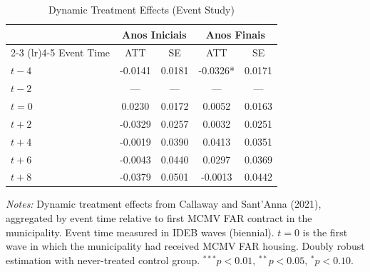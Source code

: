 \begin{table}[t]
\centering
\caption{Dynamic Treatment Effects (Event Study)}
\label{tab:event_study}
\begin{threeparttable}
\begin{tabular}{lcccc}
\toprule
 & \multicolumn{2}{c}{Anos Iniciais} & \multicolumn{2}{c}{Anos Finais} \\
\cmidrule(lr){2-3} \cmidrule(lr){4-5}
Event Time & ATT & SE & ATT & SE \\
\midrule
$t-4$ & -0.0141 & 0.0181 & -0.0326* & 0.0171 \\
$t-2$ & --- & --- & --- & --- \\
$t=0$ & 0.0230 & 0.0172 & 0.0052 & 0.0163 \\
$t+2$ & -0.0329 & 0.0257 & 0.0032 & 0.0251 \\
$t+4$ & -0.0019 & 0.0390 & 0.0413 & 0.0351 \\
$t+6$ & -0.0043 & 0.0440 & 0.0297 & 0.0369 \\
$t+8$ & -0.0379 & 0.0501 & -0.0013 & 0.0442 \\
\bottomrule
\end{tabular}
\begin{tablenotes}
\item \textit{Notes:} Dynamic treatment effects from Callaway and Sant'Anna (2021), aggregated by event time relative to first MCMV FAR contract in the municipality. Event time measured in IDEB waves (biennial). $t=0$ is the first wave in which the municipality had received MCMV FAR housing. Doubly robust estimation with never-treated control group. $^{***}p<0.01$, $^{**}p<0.05$, $^{*}p<0.10$.
\end{tablenotes}
\end{threeparttable}
\end{table}
